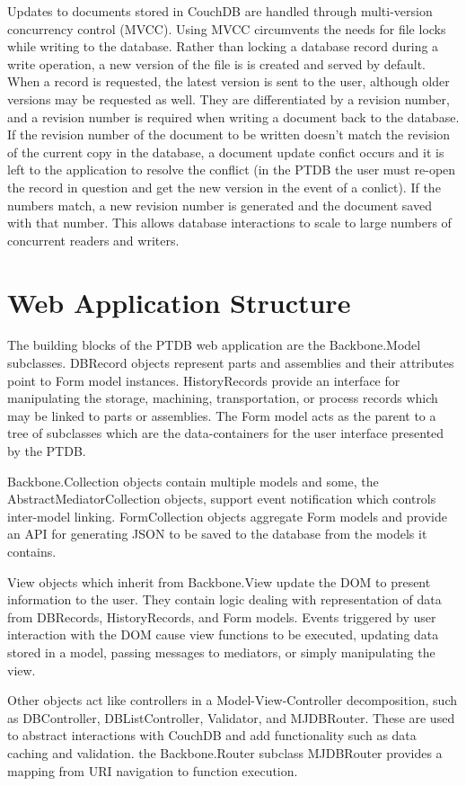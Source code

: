 \documentclass[journal]{IEEEtran}
\begin{document}
Updates to documents stored in CouchDB are handled through multi-version concurrency control (MVCC). Using MVCC
circumvents the needs for file locks while writing to the database. Rather than locking a database record during
a write operation, a new version of the file is is created and served by default. When a 
record is requested, the latest version is sent to the user, although older versions may be requested as well.
They are differentiated by a revision number, and a revision number is required when writing a document back 
to the database. If the revision number of the document to be written doesn't match the revision of the current
copy in the database,
a document update confict occurs and it is left to the application to resolve the conflict (in the PTDB the user must
re-open the record in question and get the new version in the event of a conlict). If the numbers match,
a new revision number is generated and the document saved with that number.
This allows database interactions to scale to large numbers of concurrent readers and writers.

\section{Web Application Structure}
The building blocks of the PTDB web application are the Backbone.Model subclasses. DBRecord objects represent parts
and assemblies and their attributes point to Form model instances. HistoryRecords provide an interface for manipulating 
the storage, machining, transportation, or process records which may be linked to parts or assemblies. The Form model
acts as the parent to a tree of subclasses which are the data-containers for the user interface presented by the PTDB.

Backbone.Collection objects contain multiple models and some, the AbstractMediatorCollection objects, support event notification
which controls inter-model linking. FormCollection objects aggregate Form models and provide an API for generating JSON to be
saved to the database from the models it contains.

View objects which inherit from Backbone.View update the DOM to present information to the user. They contain logic dealing with
representation of data from DBRecords, HistoryRecords, and Form models. Events triggered by user interaction with the DOM cause 
view functions to be executed, updating data stored in a model, passing messages to mediators, or simply manipulating the view.

Other objects act like controllers in a Model-View-Controller decomposition, such as DBController, DBListController, Validator,
and MJDBRouter. These are used to abstract interactions with CouchDB and add functionality such as data caching and validation. 
the Backbone.Router subclass MJDBRouter provides a mapping from URI navigation to function execution.
\end{document}
